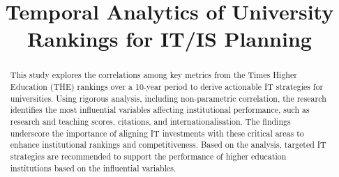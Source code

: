 \documentclass{singlecol-new}
\theoremstyle{TH}{
\newtheorem{lemma}{Lemma}
\newtheorem{theorem}[lemma]{Theorem}
\newtheorem{corrolary}[lemma]{Corrolary}
\newtheorem{conjecture}[lemma]{Conjecture}
\newtheorem{proposition}[lemma]{Proposition}
\newtheorem{claim}[lemma]{Claim}
\newtheorem{stheorem}[lemma]{Wrong Theorem}
\newtheorem{algorithm}{Algorithm}
}
\theoremstyle{THrm}{
\newtheorem{definition}{Definition}[section]
\newtheorem{question}{Question}[section]
\newtheorem{remark}{Remark}
\newtheorem{scheme}{Scheme}
}
\theoremstyle{THhit}{
\newtheorem{case}{Case}[section]
}
\begin{document}
%

\setcounter{page}{1}






\BottomCatch

\CLline

\subtitle{}

\title{Temporal Analytics of University Rankings for IT/IS Planning}

%
%
%
%
%

%
%
%
%
%
%
%

\begin{abstract}
	This study explores the correlations among key metrics from the Times Higher Education (THE) rankings over a 10-year period to derive actionable IT strategies for universities. Using rigorous analysis, including non-parametric correlation, the research identifies the most influential variables affecting institutional performance, such as research and teaching scores, citations, and internationalisation. The findings underscore the importance of aligning IT investments with these critical areas to enhance institutional rankings and competitiveness. Based on the analysis, targeted IT strategies are recommended to support the performance of higher education institutions based on the influential variables.
\end{abstract}
\end{document}
